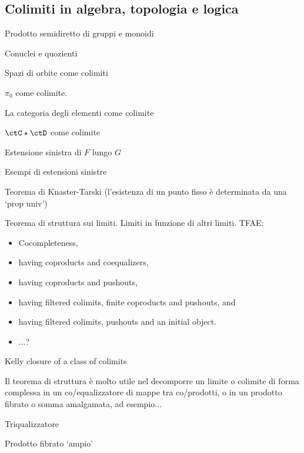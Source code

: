 \subsection{Colimiti in algebra, topologia e logica}
\begin{example}
	Prodotto semidiretto di gruppi e monoidi
\end{example}
\begin{example}

\end{example}
\begin{example}
	Conuclei e quozienti
\end{example}
\begin{example}
	Spazi di orbite come colimiti
\end{example}
\begin{example}
	\(\pi_0\) come colimite.
\end{example}
\begin{example}
	La categoria degli elementi come colimite
\end{example}
\begin{example}
	\(\ctC\star\ctD\) come colimite
\end{example}
\begin{example}
	Estensione sinistra di \(F\) lungo \(G\)
\end{example}
\begin{examples}
	Esempi di estensioni sinistre
\end{examples}
\begin{theorem}
	Teorema di Knaster-Tarski (l'esistenza di un punto fisso è determinata da una `prop univ')
\end{theorem}
\begin{theorem}
	Teorema di struttura sui limiti. Limiti in funzione di altri limiti. TFAE:
	\begin{itemize}
		\item 	Cocompleteness,
		\item having coproducts and coequalizers,
		\item having coproducts and pushouts,
		\item having filtered colimits, finite coproducts and pushouts, and
		\item having filtered colimits, pushouts and an initial object.
		\item ...?
	\end{itemize}
	Kelly closure of a class of colimits
\end{theorem}
Il teorema di struttura è molto utile nel decomporre un limite o colimite di forma complessa in un co/equalizzatore di mappe tra co/prodotti, o in un prodotto fibrato o somma amalgamata, ad esempio...
\begin{example}
	Triqualizzatore
\end{example}
\begin{example}
	Prodotto fibrato `ampio'
\end{example}
